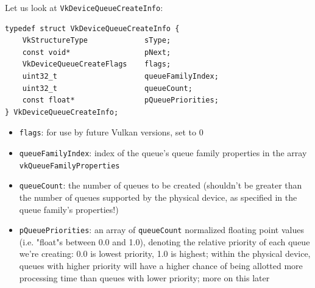 \documentclass[12pt,letterpaper]{article}
\newcommand{\cil}[1]{\texttt{#1}}
\begin{document}
	Let us look at \cil{VkDeviceQueueCreateInfo}:
\begin{verbatim}
typedef struct VkDeviceQueueCreateInfo {
	VkStructureType             sType;
	const void*                 pNext;
	VkDeviceQueueCreateFlags    flags;
	uint32_t                    queueFamilyIndex;
	uint32_t                    queueCount;
	const float*                pQueuePriorities;
} VkDeviceQueueCreateInfo;
\end{verbatim}
	\begin{itemize}
		\item \cil{flags}: for use by future Vulkan versions, set to 0 
			
		\item \cil{queueFamilyIndex}: index of the queue's queue family properties in the array \cil{vkQueueFamilyProperties}
			
		\item \cil{queueCount}: the number of queues to be created (shouldn't be greater than the number of queues supported by the physical device, as specified in the queue family's properties!)
			
		\item \cil{pQueuePriorities}: an array of \cil{queueCount} normalized floating point values (i.e. "float"s between 0.0 and 1.0), denoting the relative priority of each queue we're creating: 0.0 is lowest priority, 1.0 is highest; within the physical device, queues with higher priority will have a higher chance of being allotted more processing time than queues with lower priority; more on this later
	\end{itemize}
		
\end{document}
